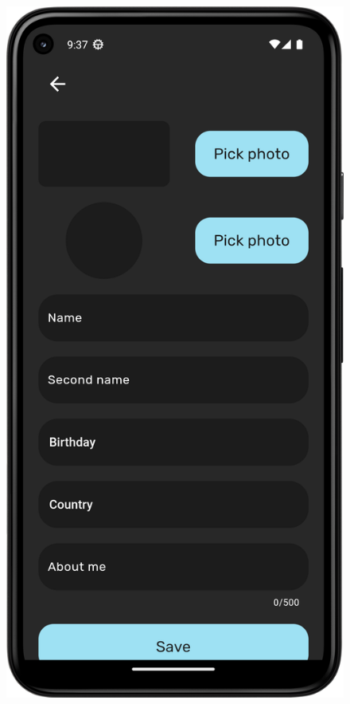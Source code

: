 \documentclass[a4paper,twoside,12pt]{book}
\begin{document}
\begin{figure}[H]
  \centering
  \begin{minipage}[b]{0.49\textwidth}
    \includegraphics[width=\textwidth]{mobile_ss/edycja_profilu_bez_danych.png}

\end{minipage}
\end{figure}
\end{document}
